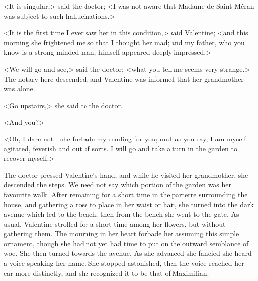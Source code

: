 <It is singular,> said the doctor; <I was not aware that Madame de Saint-Méran was subject to such hallucinations.> 

 <It is the first time I ever saw her in this condition,> said Valentine; <and this morning she frightened me so that I thought her mad; and my father, who you know is a strong-minded man, himself appeared deeply impressed.> 

 <We will go and see,> said the doctor; <what you tell me seems very strange.> The notary here descended, and Valentine was informed that her grandmother was alone. 

 <Go upstairs,> she said to the doctor. 

 <And you?> 

 <Oh, I dare not—she forbade my sending for you; and, as you say, I am myself agitated, feverish and out of sorts. I will go and take a turn in the garden to recover myself.> 

 The doctor pressed Valentine's hand, and while he visited her grandmother, she descended the steps. We need not say which portion of the garden was her favourite walk. After remaining for a short time in the parterre surrounding the house, and gathering a rose to place in her waist or hair, she turned into the dark avenue which led to the bench; then from the bench she went to the gate. As usual, Valentine strolled for a short time among her flowers, but without gathering them. The mourning in her heart forbade her assuming this simple ornament, though she had not yet had time to put on the outward semblance of woe.  She then turned towards the avenue. As she advanced she fancied she heard a voice speaking her name. She stopped astonished, then the voice reached her ear more distinctly, and she recognized it to be that of Maximilian. 